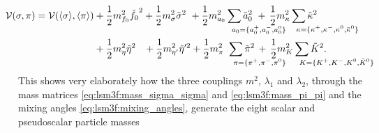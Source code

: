 \begin{equation}
\begin{split}
	\hspace{-2cm} \pot(\sigma,\pi) = \pot(\avg{\sigma},\avg{\pi}) &+ \frac12 m^2_{f_0} \tilde{f_0}^2  + \frac12 m^2_{\sigma} \tilde{\sigma}^2 \,\, + \frac12 m^2_{a_0} \sum_{\mathrlap{\!\!a_0 = \{a_0^+,a_0^-,a_0^0\}}} \tilde{a}_0^2               \,\, + \, \frac12 m^2_{\kappa} \sum_{\mathrlap{\!\!\kappa = \{\kappa^+,\kappa^-,\kappa^0,\bar{\kappa}^0\}}} \tilde{\kappa}^2 \\
	                                                              &+ \frac12 m^2_{\eta} \tilde{\eta}^2 \,\,\,\,\, + \frac12 m^2_{\eta'} \tilde{\eta}'^2 + \frac12 m^2_{\pi_{\phantom{0}}} \sum_{\mathrlap{\!\!\pi = \{\pi^+,\pi^-,\pi^0\}}} \tilde{\pi}^2 \, + \, \frac12 m^2_{K} \sum_{\mathrlap{\!\!K = \{K^+,K^-,K^0,\bar{K}^0\}}} \tilde{K}^2. \\
\end{split}
\label{eq:lsm3f:potential_after_diagonalization}
\end{equation}
This shows very elaborately how the three couplings $m^2$, $\lambda_1$ and $\lambda_2$,
through the mass matrices \eqref{eq:lsm3f:mass_sigma_sigma} and \eqref{eq:lsm3f:mass_pi_pi} and the mixing angles \eqref{eq:lsm3f:mixing_angles},
generate the eight scalar and pseudoscalar particle masses
